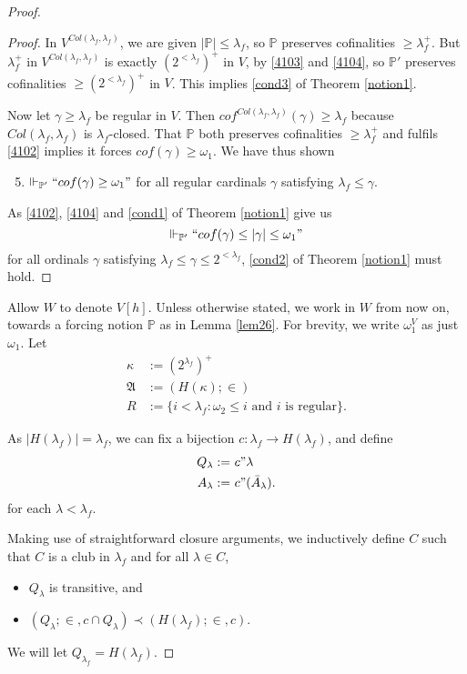 \documentclass[12pt]{article}
\numberwithin{equation}{section}
\begin{document}
\begin{proof}
\begin{proof}
In $V^{Col(\lambda_f, \lambda_f)}$, we are given $|\mathbb{P}| \leq \lambda_f$, so $\mathbb{P}$ preserves cofinalities $\geq \lambda_f^+$. But $\lambda_f^+$ in $V^{Col(\lambda_f, \lambda_f)}$ is exactly $(2^{< \lambda_f})^+$ in $V$, by \ref{4103} and \ref{4104}, so $\mathbb{P}'$ preserves cofinalities $\geq (2^{< \lambda_f})^+$ in $V$. This implies \ref{cond3} of Theorem  \ref{notion1}.

Now let $\gamma \geq \lambda_f$ be regular in $V$. Then $cof^{Col(\lambda_f, \lambda_f)} (\gamma) \geq \lambda_f$ because $Col(\lambda_f, \lambda_f)$ is $\lambda_f$-closed. That $\mathbb{P}$ both preserves cofinalities $\geq \lambda_f^+$ and fulfils \ref{4102} implies it forces $cof(\gamma) \geq \omega_1$. We have thus shown
\begin{enumerate}[label=(\arabic*')]
    \setcounter{enumi}{4}
    \item\label{4105} $\Vdash_{\mathbb{P}'} ``cof(\gamma) \geq \omega_1"$ for all regular cardinals $\gamma$ satisfying $\lambda_f \leq \gamma$.
\end{enumerate}
As \ref{4102}, \ref{4104} and \ref{cond1} of Theorem \ref{notion1} give us $$\Vdash_{\mathbb{P}'} ``cof(\gamma) \leq |\gamma| \leq \omega_1"$$ for all ordinals $\gamma$ satisfying $\lambda_f \leq \gamma \leq 2^{< \lambda_f}$, \ref{cond2} of Theorem \ref{notion1} must hold.
\end{proof}

Allow $W$ to denote $V[h]$. Unless otherwise stated, we work in $W$ from now on, towards a forcing notion $\mathbb{P}$ as in Lemma \ref{lem26}. For brevity, we write $\omega_1^V$ as just $\omega_1$. Let 
\begin{align*}
    \kappa & := (2^{\lambda_f})^+  \\
    \mathfrak{A} & := (H(\kappa); \in) \\
    R & := \{i < \lambda_f : \omega_2 \leq i \text{ and } i \text{ is regular}\} \text{.}
\end{align*}

As $|H(\lambda_f)| = \lambda_f$, we can fix a bijection $c : \lambda_f \longrightarrow H(\lambda_f)$, and define
\begin{align*}
    Q_{\lambda} := \ & c" \lambda \\
    A_{\lambda} := \ & c" (\bar{A}_{\lambda}) \text{.}
\end{align*}
for each $\lambda < \lambda_f$.

Making use of straightforward closure arguments, we inductively define $C$ such that $C$ is a club in $\lambda_f$ and for all $\lambda \in C$, 
\begin{itemize}
    \item $Q_{\lambda}$ is transitive, and
    \item $(Q_{\lambda}; \in, c \cap Q_{\lambda}) \prec (H(\lambda_f); \in, c)$.
\end{itemize}
We will let $Q_{\lambda_f} = H(\lambda_f)$.


\end{proof}
\end{document}
